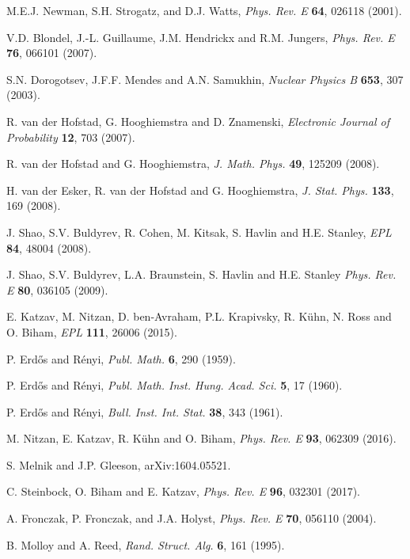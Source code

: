 \documentclass[preprint,pre,superscriptaddress,showpacs]{revtex4}
\begin{document}
\begin{thebibliography}{10}
M.E.J. Newman, S.H. Strogatz, and D.J. Watts,
{\it Phys. Rev. E} {\bf 64}, 026118 (2001).


V.D. Blondel, J.-L. Guillaume, J.M. Hendrickx and R.M. Jungers, 
{\it Phys. Rev. E} {\bf 76}, 066101 (2007).

S.N. Dorogotsev, J.F.F. Mendes and A.N. Samukhin, 
{\it Nuclear Physics B} {\bf 653}, 307 (2003).

R. van der Hofstad, G. Hooghiemstra and D. Znamenski, 
{\it Electronic Journal of Probability} 
{\bf 12}, 703 (2007).

R. van der Hofstad and G. Hooghiemstra, 
{\it J. Math. Phys.} {\bf 49}, 125209 (2008).

H. van der Esker, R. van der Hofstad and G. Hooghiemstra, 
{\it J. Stat. Phys.} {\bf 133}, 169 (2008).

J. Shao, S.V. Buldyrev, R. Cohen, M. Kitsak, S. Havlin and
H.E. Stanley,
{\it EPL} {\bf 84}, 48004 (2008).

J. Shao, S.V. Buldyrev,
L.A. Braunstein, S. Havlin and H.E. Stanley 
{\it Phys. Rev. E} {\bf 80}, 036105 (2009).

E. Katzav, M. Nitzan, D. ben-Avraham, P.L. Krapivsky, R. K\"uhn, 
N. Ross and O. Biham,
{\it EPL} {\bf 111}, 26006 (2015).

P. Erd{\H o}s and R\'{e}nyi, 
{\it Publ. Math.} {\bf 6}, 290 (1959).

P. Erd{\H o}s and R\'{e}nyi, 
{\it Publ. Math. Inst. Hung. Acad. Sci.} 
{\bf 5}, 17 (1960).

P. Erd{\H o}s and R\'{e}nyi, 
{\it Bull. Inst. Int. Stat.} 
{\bf 38}, 343 (1961).


M. Nitzan, E. Katzav, R. K\"uhn and O. Biham,
{\it Phys. Rev. E} {\bf 93}, 062309 (2016).

S. Melnik and J.P. Gleeson, 
arXiv:1604.05521. 

C. Steinbock, O. Biham and E. Katzav,
{\it Phys. Rev. E} {\bf 96}, 032301 (2017).

A. Fronczak, P. Fronczak, and J.A. Holyst, 
{\it Phys. Rev. E} {\bf 70}, 056110 (2004).



B. Molloy and A. Reed,
{\it Rand. Struct. Alg.} {\bf 6}, 161 (1995).


\end{thebibliography}
\end{document}
